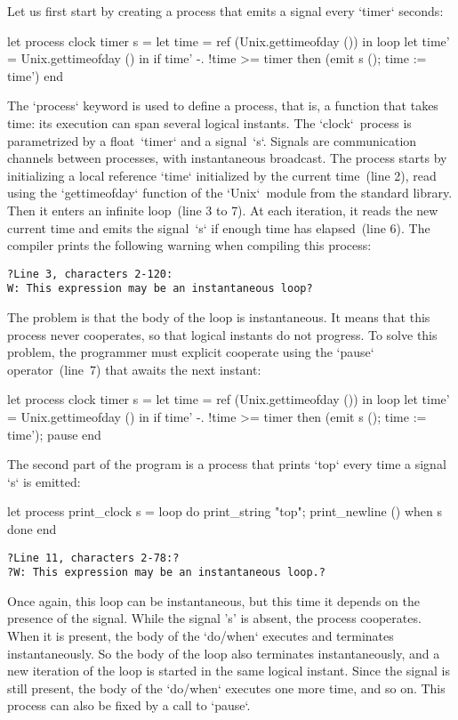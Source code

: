 \documentclass[9pt,preprint]{sigplanconf}
\begin{document}
Let us first start by creating a process that emits a signal every `timer` seconds:
%
\begin{rmlcl}
let process clock timer s =
  let time = ref (Unix.gettimeofday ()) in
  loop
    let time' = Unix.gettimeofday () in
    if time' -. !time >= timer
    then (emit s (); time := time')
  end
\end{rmlcl}
%
The `process` keyword is used to define a process, that is, a function that takes time: its execution can span several logical instants. The `clock`~process is parametrized by a float~`timer` and a signal~`s`. Signals are communication channels between processes, with instantaneous broadcast. The process starts by initializing a local reference `time` initialized by the current time~(line 2), read using the `gettimeofday` function of the `Unix`~module from the standard library. Then it enters an infinite loop~(line 3 to 7). At each iteration, it reads the new current time and emits the signal~`s` if enough time has elapsed~(line 6). The compiler prints the following warning when compiling this process:
\begin{lstlisting}
?Line 3, characters 2-120:
W: This expression may be an instantaneous loop?
\end{lstlisting}
The problem is that the body of the loop is instantaneous. It means that this process never cooperates, so that logical instants do not progress. To solve this problem, the programmer must explicit cooperate using the `pause` operator~(line~7) that awaits the next instant:
\begin{rmlcl}
let process clock timer s =
  let time = ref (Unix.gettimeofday ()) in
  loop
    let time' = Unix.gettimeofday () in
    if time' -. !time >= timer
    then (emit s (); time := time');
    pause 
  end
\end{rmlcl}

The second part of the program is a process that prints `top` every time a signal `s` is emitted:
\begin{rmlcl}[10]
let process print_clock s =
  loop
    do
      print_string "top"; print_newline ()
    when s done
  end
\end{rmlcl}
\begin{lstlisting}
?Line 11, characters 2-78:?
?W: This expression may be an instantaneous loop.?
\end{lstlisting}
%
Once again, this loop can be instantaneous, but this time it depends on the presence of the signal. While the signal 's' is absent, the process cooperates. When it is present, the body of the `do/when` executes and terminates instantaneously. So the body of the loop also terminates instantaneously, and a new iteration of the loop is started in the same logical instant. Since the signal is still present, the body of the `do/when` executes one more time, and so on. This process can also be fixed by a call to `pause`.
\end{document}
